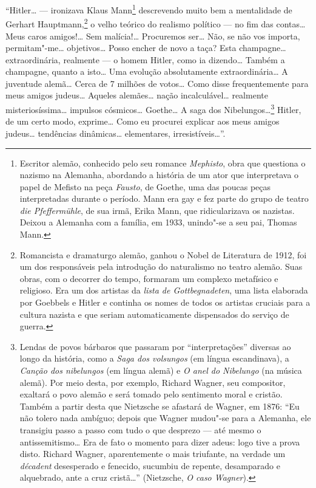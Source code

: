 ``Hitler\ldots{} --- ironizava Klaus Mann\footnote{Escritor alemão, conhecido pelo seu romance \emph{Mephisto}, obra que
  questiona o nazismo na Alemanha, abordando a história de um ator que
  interpretava o papel de Mefisto na peça \emph{Fausto}, de Goethe, uma
  das poucas peças interpretadas durante o período. Mann era gay e fez
  parte do grupo de teatro \emph{die Pfeffermühle}, de sua irmã, Erika
  Mann, que ridicularizava os nazistas. Deixou a Alemanha com a família,
  em 1933, unindo"-se a seu pai, Thomas Mann.} descrevendo muito bem a mentalidade de Gerhart
Hauptmann,\footnote{Romancista e dramaturgo alemão, ganhou o Nobel de Literatura de 1912,
  foi um dos responsáveis pela introdução do naturalismo no teatro
  alemão. Suas obras, com o decorrer do tempo, formaram um complexo
  metafísico e religioso. Era um dos artistas da \emph{lista de
  Gottbegnadeten}, uma lista elaborada por Goebbels e Hitler e continha
  os nomes de todos os artistas cruciais para a cultura nazista e que
  seriam automaticamente dispensados do serviço de guerra.} o velho teórico do realismo político --- no fim das
contas\ldots{} Meus caros amigos!\ldots{} Sem malícia!\ldots{} Procuremos ser\ldots{} Não,
se não vos importa, permitam"-me\ldots{} objetivos\ldots{} Posso encher de novo a
taça? Esta champagne\ldots{} extraordinária, realmente --- o homem Hitler,
como ia dizendo\ldots{} Também a champagne, quanto a isto\ldots{} Uma evolução
absolutamente extraordinária\ldots{} A juventude alemã\ldots{} Cerca de 7 milhões
de votos\ldots{} Como disse frequentemente para meus amigos judeus\ldots{} Aqueles
alemães\ldots{} nação incalculável\ldots{} realmente misteriosíssima\ldots{} impulsos
cósmicos\ldots{} Goethe\ldots{} A saga dos Nibelungos\ldots{}\footnote{Lendas de povos bárbaros que
  passaram por ``interpretações'' diversas ao longo da história, como a
  \emph{Saga dos volsungos} (em língua escandinava), a \emph{Canção dos
  nibelungos} (em língua alemã) e \emph{O anel do Nibelungo} (na música
  alemã). Por meio desta, por exemplo, Richard Wagner, seu compositor,
  exaltará o povo alemão e será tomado pelo sentimento moral e cristão.
  Também a partir desta que Nietzsche se afastará de Wagner, em 1876:
  ``Eu não tolero nada ambíguo; depois que Wagner mudou"-se para a
  Alemanha, ele transigiu passo a passo com tudo o que desprezo --- até
  mesmo o antissemitismo\ldots{} Era de fato o momento para dizer adeus: logo
  tive a prova disto. Richard Wagner, aparentemente o mais triufante, na
  verdade um \emph{décadent} desesperado e fenecido, sucumbiu de
  repente, desamparado e alquebrado, ante a cruz cristã\ldots{}'' (Nietzsche,
  \emph{O caso Wagner}).} Hitler, de um certo modo, exprime\ldots{} Como eu procurei
explicar aos meus amigos judeus\ldots{} tendências dinâmicas\ldots{} elementares,
irresistíveis\ldots{}''.

